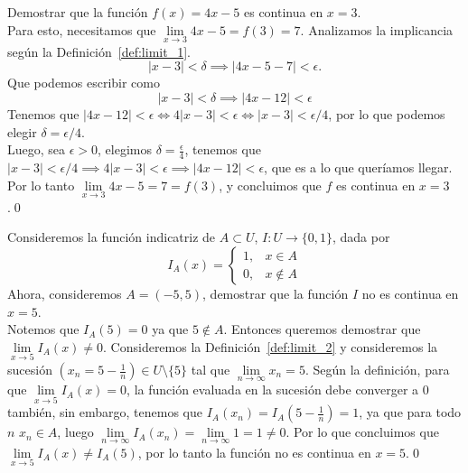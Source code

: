 \documentclass[12pt]{book}
\begin{document}
\begin{exampleenv}
    Demostrar que la función $f(x)=4x-5$ es continua en $x=3$.\\

    Para esto, necesitamos que $\lim\limits_{x\to3}4x-5=f(3)=7$. Analizamos la implicancia según la Definición~\ref{def:limit_1}.
    \[
    |x-3|<\delta\implies |4x-5-7|<\epsilon.
    \]
    Que podemos escribir como
    \[
    |x-3|<\delta\implies |4x-12|<\epsilon
    \]
    Tenemos que $|4x-12|<\epsilon \iff 4|x-3|<\epsilon\iff |x-3|<\epsilon/4$, por lo que podemos elegir $\delta =\epsilon/4$.\\

    Luego, sea $\epsilon >0$, elegimos $\delta =\frac{\epsilon}{4}$, tenemos que $|x-3|<\epsilon/4\implies 4|x-3|<\epsilon\implies |4x-12|<\epsilon$, que es a lo que queríamos llegar. Por lo tanto $\lim\limits_{x\to3}4x-5=7=f(3)$, y concluimos que $f$ es continua en $x=3$.\qed
\end{exampleenv}

\begin{exampleenv}
    Consideremos la función indicatriz de $A\subset U$, $I:U\to \{0,1\}$, dada por
    \[
    I_A(x)=
    \begin{cases}
        1, &x\in A\\
        0, &x\notin A
    \end{cases}
    \]
    Ahora, consideremos $A=(-5,5)$, demostrar que la función $I$ no es continua en $x=5$.\\

    Notemos que $I_A(5)=0$ ya que $5\notin A$. Entonces queremos demostrar que $\lim\limits_{x\to 5} I_A(x)\neq 0$. Consideremos la Definición~\ref{def:limit_2} y consideremos la sucesión $(x_n=5-\frac{1}{n})\in U\setminus\{5\}$ tal que $\lim\limits_{n\to\infty} x_n=5$. Según la definición, para que $\lim\limits_{x\to 5}I_A(x)=0$, la función evaluada en la sucesión debe converger a $0$ también, sin embargo, tenemos que $I_A(x_n)=I_A(5-\frac{1}{n})=1$, ya que para todo $n$ $x_n\in A$, luego $\lim\limits_{n\to\infty} I_A(x_n)=\lim\limits_{n\to\infty} 1=1\neq0$. Por lo que concluimos que $\lim\limits_{x\to 5} I_A(x)\neq I_A(5)$, por lo tanto la función no es continua en $x=5$.\qed
\end{exampleenv}
\end{document}
